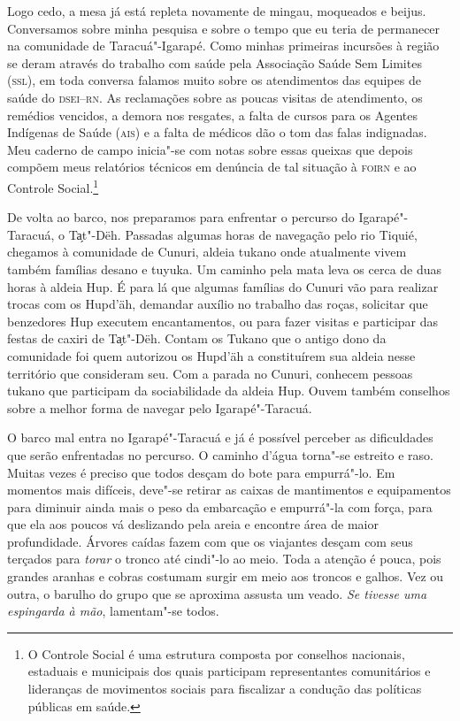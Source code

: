 Logo cedo, a mesa já está repleta novamente de mingau, moqueados e
beijus. Conversamos sobre minha pesquisa e sobre o tempo que eu teria de
permanecer na comunidade de Taracuá"-Igarapé. Como minhas primeiras
incursões à região se deram através do trabalho com saúde pela
Associação Saúde Sem Limites (\textsc{ssl}), em toda conversa falamos muito sobre
os atendimentos das equipes de saúde do \textsc{dsei--rn}. As reclamações sobre as
poucas visitas de atendimento, os remédios vencidos, a demora nos
resgates, a falta de cursos para os Agentes Indígenas de Saúde (\textsc{ais}) e a
falta de médicos dão o tom das falas indignadas. Meu caderno de campo
inicia"-se com notas sobre essas queixas que depois compõem meus
relatórios técnicos em denúncia de tal situação à \textsc{foirn} e ao Controle
Social.\footnote{O Controle Social é uma estrutura composta por conselhos
  nacionais, estaduais e municipais dos quais participam representantes
  comunitários e lideranças de movimentos sociais para fiscalizar a
  condução das políticas públicas em saúde.}

De volta ao barco, nos preparamos para enfrentar o percurso do
Igarapé"-Taracuá, o Ta̗t"-Dëh. Passadas algumas horas de navegação pelo
rio Tiquié, chegamos à comunidade de Cunuri, aldeia tukano onde
atualmente vivem também famílias desano e tuyuka. Um caminho pela mata
leva os cerca de duas horas à aldeia Hup. É para lá que algumas famílias
do Cunuri vão para realizar trocas com os Hupd'äh, demandar auxílio no
trabalho das roças, solicitar que benzedores Hup executem encantamentos,
ou para fazer visitas e participar das festas de caxiri de Ta̗t"-Dëh.
Contam os Tukano que o antigo dono da comunidade foi quem autorizou os
Hupd'äh a constituírem sua aldeia nesse território que consideram seu.
Com a parada no Cunuri, conhecem pessoas tukano que participam da
sociabilidade da aldeia Hup. Ouvem também conselhos sobre a melhor forma
de navegar pelo Igarapé"-Taracuá.

O barco mal entra no Igarapé"-Taracuá e já é possível perceber as
dificuldades que serão enfrentadas no percurso. O caminho d'água
torna"-se estreito e raso. Muitas vezes é preciso que todos desçam do
bote para empurrá"-lo. Em momentos mais difíceis, deve"-se retirar as
caixas de mantimentos e equipamentos para diminuir ainda mais o peso da
embarcação e empurrá"-la com força, para que ela aos poucos vá deslizando
pela areia e encontre área de maior profundidade. Árvores caídas fazem
com que os viajantes desçam com seus terçados para \textit{torar} o tronco
até cindi"-lo ao meio. Toda a atenção é pouca, pois grandes aranhas e
cobras costumam surgir em meio aos troncos e galhos. Vez ou outra, o
barulho do grupo que se aproxima assusta um veado. \textit{Se tivesse uma
espingarda à mão}, lamentam"-se todos.

